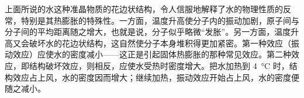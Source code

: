 \begin{dialogue}
上面所说的水这种准晶物质的花边状结构，令人信服地解释了水的物理性质的反常，特别是其热膨胀的特殊性。一方面，温度升高使分子内的振动加剧，原子间与分子间的平均距离随之增大，也就是说，分子似乎略微“发胀”。另一方面，温度升高又会破坏水的花边状结构，这自然使分子本身堆积得更加紧密。第一种效应（振动效应）应使水的密度减小——这正是引起固体热膨胀的那种常见效应。第二种效应，即结构破坏效应，则相反，应使水受热时密度增大。把水加热到 \SI{4}{\degreeCelsius} 时，结构效应占上风，水的密度因而增大；继续加热，振动效应开始占上风，水的密度便随之减小。

\end{dialogue}


\cleardoublepage

